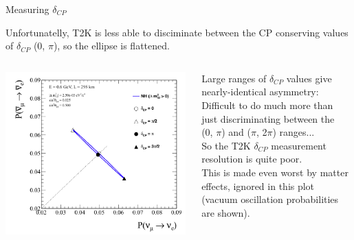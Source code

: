 %
%
\begin{frame}{Measuring $\delta_{CP}$}

{\small
      Unfortunatelly, T2K is less able to disciminate between the
      CP conserving values of $\delta_{CP}$ (0, $\pi$), so the ellipse
      is flattened.
}

\begin{columns}
  \begin{column}{0.60\textwidth}
    \begin{center}
       \includegraphics[width=0.99\textwidth]{./images/biprob/biprob_t2k_vac_maximal}
    \end{center}
  \end{column}
  \begin{column}{0.40\textwidth}
  {\small
      Large ranges of $\delta_{CP}$ values give nearly-identical
      asymmetry:\\ Difficult to do much more than just discriminating
      between the\\ (0, $\pi$) and ($\pi$, 2$\pi$) ranges...\\
      \vspace{0.2cm}
      So the T2K $\delta_{CP}$ measurement resolution is quite poor.\\
      \vspace{0.2cm}
      This is made even worst by matter effects, ignored in this plot
      (vacuum oscillation probabilities are shown).\\
   }
  \end{column}
\end{columns}

\end{frame}

